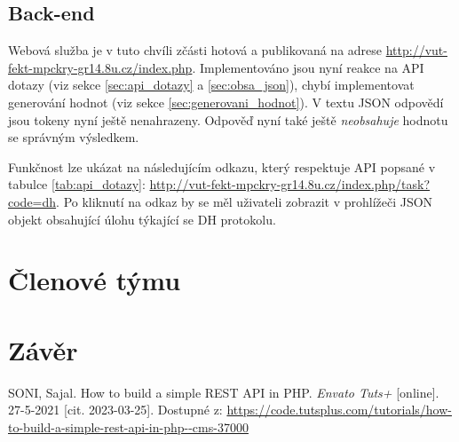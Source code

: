 \documentclass[titlepage]{article}
\begin{document}
\subsection{Back-end}
Webová služba je v tuto chvíli zčásti hotová a publikovaná na adrese \url{http://vut-fekt-mpckry-gr14.8u.cz/index.php}. Implementováno jsou nyní reakce na API dotazy (viz sekce \ref{sec:api_dotazy} a \ref{sec:obsa_json}), chybí implementovat generování hodnot (viz sekce \ref{sec:generovani_hodnot}). V textu JSON odpovědí jsou tokeny  nyní ještě nenahrazeny. Odpověď nyní také ještě \emph{neobsahuje} hodnotu se správným výsledkem. 

Funkčnost lze ukázat na následujícím odkazu, který respektuje API popsané v tabulce \ref{tab:api_dotazy}:
\url{http://vut-fekt-mpckry-gr14.8u.cz/index.php/task?code=dh}.
Po kliknutí na odkaz by se měl uživateli zobrazit v prohlížeči JSON objekt obsahující úlohu týkající se DH protokolu. 

\section{Členové týmu}

\section*{Závěr}



\begin{thebibliography}{9}
    SONI, Sajal. How to build a simple REST API in PHP. \emph{En\-va\-to Tuts+} [on\-li\-ne]. 27-5-2021 [cit. 2023-03-25]. Dostupné z: \url{https://code.tutsplus.com/tutorials/how-to-build-a-simple-rest-api-in-php--cms-37000}
\end{thebibliography}
\end{document}
